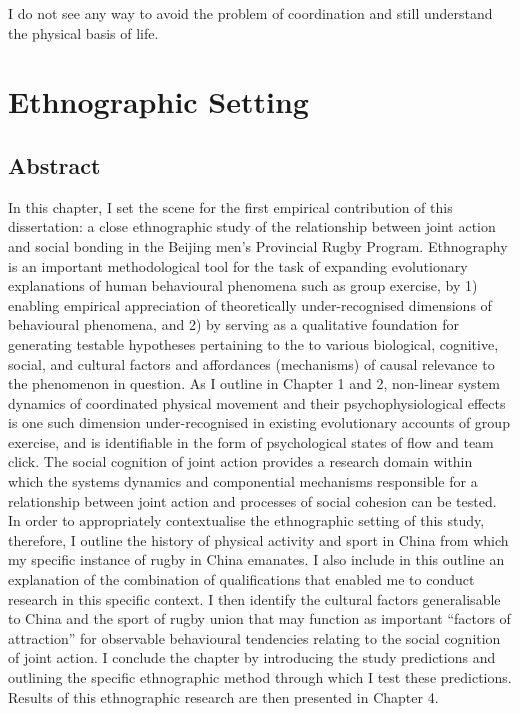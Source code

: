 

\begin{savequote}[8cm]

  I do not see any way to avoid the problem of coordination and still understand the physical basis of life.

\end{savequote}


\chapter{\label{ethnographicSetting}Ethnographic Setting}


\minitoc


\section{Abstract}
In this chapter, I set the scene for the first empirical contribution of this dissertation: a close ethnographic study of the relationship between joint action and social bonding in the Beijing men's Provincial Rugby Program.  Ethnography is an important methodological tool for the task of expanding evolutionary explanations of human behavioural phenomena such as group exercise, by 1) enabling empirical appreciation of theoretically under-recognised dimensions of behavioural phenomena, and 2) by serving as a qualitative foundation for generating testable hypotheses pertaining to the to various biological, cognitive, social, and cultural factors and affordances (mechanisms) of causal relevance to the phenomenon in question.  As I outline in Chapter 1 and 2, non-linear system dynamics of coordinated physical movement and their psychophysiological effects is one such dimension under-recognised in existing evolutionary accounts of group exercise, and is identifiable in the form of psychological states of flow and team click. The social cognition of joint action provides a research domain within which the systems dynamics and componential mechanisms responsible for a relationship between joint action and processes of social cohesion can be tested. In order to appropriately contextualise the ethnographic setting of this study, therefore, I outline the history of physical activity and sport in China from which my specific instance of rugby in China emanates. I also include in this outline an explanation of the combination of qualifications that enabled me to conduct research in this specific context.  I then identify the cultural factors generalisable to China and the sport of rugby union that may function as important ``factors of attraction'' for observable behavioural tendencies relating to the social cognition of joint action.  I conclude the chapter by introducing the study predictions and outlining the specific ethnographic method through which I test these predictions.  Results of this ethnographic research are then presented in Chapter 4.

